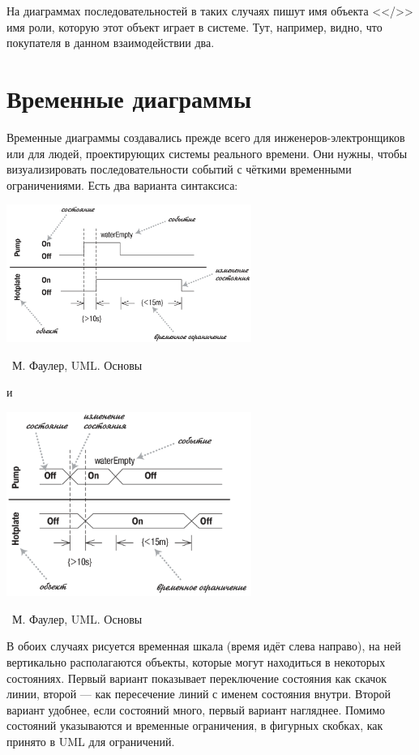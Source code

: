 \documentclass[a5paper]{article}
\newcommand{\attribution}[1] {
	\vspace{-5mm}\begin{flushright}\begin{scriptsize}%
	{\textcopyright\, #1}\end{scriptsize}\end{flushright}
}
\begin{document}
На диаграммах последовательностей в таких случаях пишут имя объекта <</>> имя роли, которую этот объект играет в системе. Тут, например, видно, что покупателя в данном взаимодействии два.

\section{Временные диаграммы}

Временные диаграммы создавались прежде всего для инженеров-электронщиков или для людей, проектирующих системы реального времени. Они нужны, чтобы визуализировать последовательности событий с чёткими временными ограничениями. Есть два варианта синтаксиса:

\begin{center}
	\includegraphics[width=0.6\textwidth]{timingDiagrams.png}
	\attribution{М. Фаулер, UML. Основы}
\end{center}

и

\begin{center}
	\includegraphics[width=0.6\textwidth]{timingDiagramsAlternate.png}
	\attribution{М. Фаулер, UML. Основы}
\end{center}

В обоих случаях рисуется временная шкала (время идёт слева направо), на ней вертикально располагаются объекты, которые могут находиться в некоторых состояниях. Первый вариант показывает переключение состояния как скачок линии, второй --- как пересечение линий с именем состояния внутри. Второй вариант удобнее, если состояний много, первый вариант нагляднее. Помимо состояний указываются и временные ограничения, в фигурных скобках, как принято в UML для ограничений.
\end{document}
